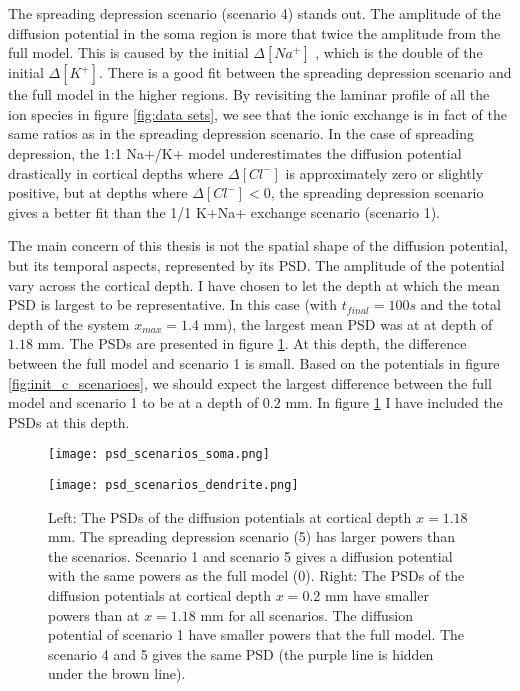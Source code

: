 \documentclass{article}
\begin{document}
The spreading depression scenario (scenario 4) stands out. The amplitude of the diffusion potential in the soma region is more that twice the amplitude from the full model. This is caused by the initial $\Delta [Na^+]$ , which is the double of the initial $\Delta[K^+]$. There is a good fit between the spreading depression scenario and the full model in the higher regions. By revisiting the laminar profile of all the ion species in figure \ref{fig:data sets}, we see that the ionic exchange is in fact of the same ratios as in the spreading depression scenario. In the case of spreading depression, the 1:1 Na+/K+ model underestimates the diffusion potential drastically in cortical depths where $\Delta [Cl^-]$ is approximately zero or slightly positive, but at depths where  $\Delta [Cl^-]<0$, the spreading depression scenario gives a better fit than the 1/1 K+Na+ exchange scenario (scenario 1).

The main concern of this thesis is not the spatial shape of the diffusion potential, but its temporal aspects, represented by its PSD. The amplitude of the potential vary across the cortical depth. I have chosen to let the depth at which the mean PSD is largest to be representative. In this case (with $t_{final}=100s$ and the total depth of the system $x_{max} = 1.4$ mm), the largest mean PSD was at at depth of $1.18$ mm. The PSDs are presented in figure \ref{fig:psd_scenarios}. At this depth, the difference between the full model and scenario 1 is small. Based on the potentials in figure \ref{fig:init_c_scenarioes}, we should expect the largest difference between the full model and scenario 1 to be at a depth of $0.2$ mm. In figure \ref{fig:psd_scenarios} I have included the PSDs at this depth. 

\begin{figure}[!tbp]
  \centering
  \begin{minipage}[b]{0.45\textwidth}
    \texttt{[image: psd\_scenarios\_soma.png]}

  \end{minipage}
\hfill
  \begin{minipage}[b]{0.45\textwidth}
    \texttt{[image: psd\_scenarios\_dendrite.png]}

  \end{minipage}

  \caption{Left: The PSDs of the diffusion potentials at cortical depth $x=1.18$ mm. The spreading depression scenario (5) has larger powers than the scenarios. Scenario 1 and scenario 5 gives a diffusion potential with the same powers as the full model (0). 
  Right: The PSDs of the diffusion potentials at cortical depth $x=0.2$ mm have smaller powers than at $x=1.18$ mm for all scenarios. The diffusion potential of scenario 1 have smaller powers that the full model. The scenario 4 and 5 gives the same PSD (the purple line is hidden under the brown line). }
  \label{fig:psd_scenarios}
\end{figure} 
\end{document}
